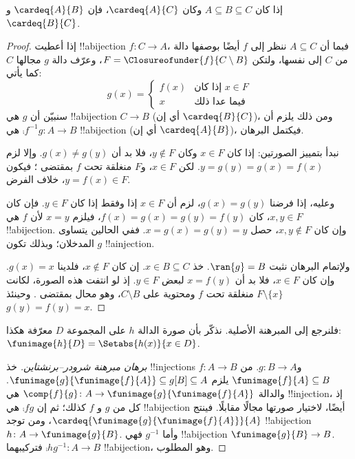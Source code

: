 \documentclass[../../../include/open-logic-section]{subfiles}
\begin{document}
\begin{prop}
إذا كان $A \subseteq B \subseteq C$ وكان $\cardeq{A}{C}$، فإن $\cardeq{A}{B}$ و$\cardeq{B}{C}$.
\end{prop}

\begin{proof}
إذا أعطيت !!a{bijection} $f \colon C \to A$، فبما أن $A\subseteq C$
ننظر إلى $f$ أيضًا بوصفها دالة من $C$ إلى نفسها، ولتكن $F =
\Closureofunder{f}{C \setminus B}$، وعرّف دالة $g$ مجالها $C$ كما
يأتي:
\[
	g(x) =
	\begin{cases}
			f(x) &\text{إذا كان $x \in F$}\\
			x & \text{فيما عدا ذلك}
		\end{cases}
\]
سنبيّن أن $g$ هي !!a{bijection} $C \to B$ (أي إن $\cardeq{B}{C}$)، ومن ذلك يلزم أن
$\comp{f^{-1}}{g} \colon A \to B$ هي !!a{bijection} (أي إن $\cardeq{A}{B}$)، فيكتمل البرهان.

نبدأ بتمييز الصورتين: إذا كان $x \in F$ وكان $y\notin F$، فلا بد أن $g(x) \neq
g(y)$. وإلا لزم $y = g(y) = g(x) =
f(x)$. لكن $x \in F$، و$F$ منغلقة تحت $f$ بمقتضى
؛ فيكون $y = f(x) \in F$، خلاف الفرض.

وعليه، إذا فرضنا $g(x) = g(y)$، لزم أن $x \in F$ إذا
وفقط إذا كان $y \in F$. فإن كان $x, y \in F$، كان $f(x) = g (x) =
g(y) = f(y)$، فيلزم $x = y$ لأن $f$ هي !!a{bijection}. وإن كان
$x, y \notin F$، حصل $x = g(x) = g(y) = y$. ففي الحالين يتساوى المدخلان؛ وبذلك تكون $g$
!!a{injection}.

ولإتمام البرهان نثبت $\ran{g} = B$. خذ $x \in B \subseteq C$. إن كان
$x \notin F$، فلدينا $g(x) = x$. وإن كان $x \in F$، فلا بد أن $x = f(y)$
لبعض $y \in F$. إذ لو انتفت هذه الصورة، لكانت $F \setminus \{x\}$
منغلقة تحت $f$ ومحتوية على $C\setminus B$، وهو محال بمقتضى
. وحينئذ $g(y) = f(y) = x$.
\end{proof}

فلنرجع إلى المبرهنة الأصلية. نذكّر بأن صورة الدالة $h$ على المجموعة $D$ معرّفة هكذا:
$\funimage{h}{D} = \Setabs{h(x)}{x
\in D}$.

\begin{proof}[برهان مبرهنة شرودر–برنشتاين] خذ !!{injection}s
$f \colon A \to B$ و$g \colon B \to A$. من $\funimage{f}{A}
\subseteq B$ يلزم $\funimage{g}{\funimage{f}{A}} \subseteq
g[B] \subseteq A$. والدالة $\comp{f}{g} \colon A \to
\funimage{g}{\funimage{f}{A}}$ هي !!{injection}، إذ كل من $g$ و
$f$ كذلك؛ ثم إن $\comp{f}{g}$ هي !!a{bijection} أيضًا، لاختيار صورتها مجالًا مقابلًا. فينتج
$\cardeq{\funimage{g}{\funimage{f}{A}}}{A}$، ومن
 توجد !!a{bijection} $h \colon A \to
\funimage{g}{B}$. وأما $g^{-1}$ فهي !!a{bijection}
$\funimage{g}{B} \to B$. فتركيبهما $\comp{h}{g^{-1}} \colon A \to B$
!!a{bijection}، وهو المطلوب.
\end{proof}
\end{document}
